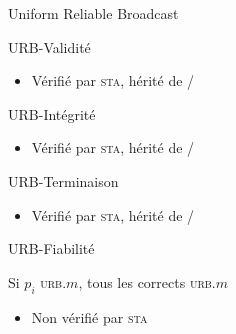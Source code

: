 
\begingroup

\begin{frame}{Uniform Reliable Broadcast}

  \begin{block}{URB-Validité}
    \begin{center}
      \vspace{-3mm}
      \vspace{-3mm}
    \end{center}
    \begin{itemize}
    \item Vérifié par \textsc{sta}, hérité de \Send/\Receive
    \end{itemize}
  \end{block}

  \begin{block}{URB-Intégrité}
    \begin{center}
      \vspace{-3mm}
      \vspace{-3mm}
    \end{center}
    \begin{itemize}
    \item Vérifié par \textsc{sta}, hérité de \Send/\Receive
    \end{itemize}
  \end{block}

  \begin{block}{URB-Terminaison}
    \begin{center}
      \vspace{-3mm}
      \vspace{-3mm}
    \end{center}
    \begin{itemize}
    \item Vérifié par \textsc{sta}, hérité de \Send/\Receive
    \end{itemize}
  \end{block}

  \begin{alertblock}{URB-Fiabilité}
    \begin{center}
      \vspace{-3mm}
      \alert{Si $p_i$ \textsc{urb}.\Deliver $m$, tous les corrects \textsc{urb}.\Deliver $m$}
      \vspace{-3mm}
    \end{center}
    \begin{itemize}
    \item Non vérifié par \textsc{sta}
    \end{itemize}
  \end{alertblock}
  

\end{frame}
